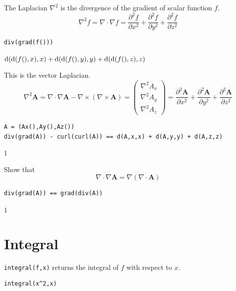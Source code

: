 \documentclass[12pt]{article}
\begin{document}
The Laplacian $\nabla^2$ is the divergence of the gradient of scalar function $f$.
\begin{equation*}
\nabla^2f=\nabla\cdot\nabla f
=\frac{\partial^2 f}{\partial x^2}
+\frac{\partial^2 f}{\partial y^2}
+\frac{\partial^2 f}{\partial z^2}
\end{equation*}

{\color{blue}
\begin{verbatim}
div(grad(f()))
\end{verbatim}}

$\displaystyle
\operatorname{\rm d}(\operatorname{\rm d}(f(),x),x)
+\operatorname{\rm d}(\operatorname{\rm d}(f(),y),y)
+\operatorname{\rm d}(\operatorname{\rm d}(f(),z),z)
$

\bigskip
This is the vector Laplacian.
\begin{equation*}
\nabla^2\mathbf A
=\nabla\cdot\nabla\mathbf A-\nabla\times(\nabla\times\mathbf A)
=\begin{pmatrix}
\nabla^2A_x
\\
\nabla^2A_y
\\
\nabla^2A_z
\end{pmatrix}
=\frac{\partial^2\mathbf A}{\partial x^2}
+\frac{\partial^2\mathbf A}{\partial y^2}
+\frac{\partial^2\mathbf A}{\partial z^2}
\end{equation*}

{\color{blue}
\begin{verbatim}
A = (Ax(),Ay(),Az())
div(grad(A)) - curl(curl(A)) == d(A,x,x) + d(A,y,y) + d(A,z,z)
\end{verbatim}}

$1$

\bigskip
Show that
\begin{equation*}
\nabla\cdot\nabla\mathbf A=\nabla(\nabla\cdot\mathbf A)
\end{equation*}

{\color{blue}
\begin{verbatim}
div(grad(A)) == grad(div(A))
\end{verbatim}}

$1$

\newpage

\section{Integral}

\verb$integral(f,x)$ returns the integral of $f$ with respect to $x$.

{\color{blue}
\begin{verbatim}
integral(x^2,x)
\end{verbatim}
}
\end{document}
